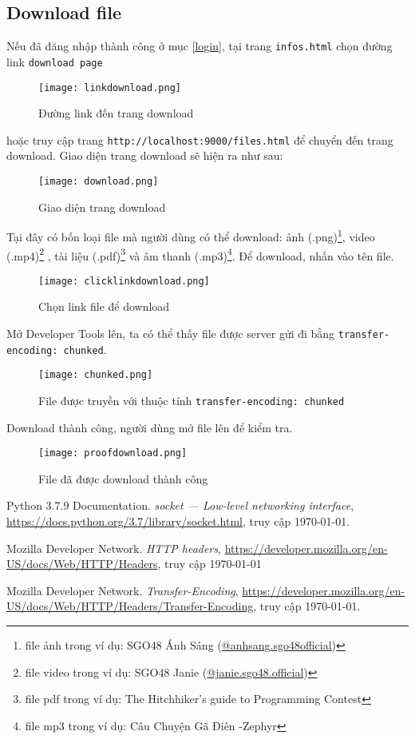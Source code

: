 \documentclass[]{article}
\begin{document}
\subsection{Download file}
Nếu đã đăng nhập thành công ở mục \ref{login}, tại trang \texttt{infos.html} chọn đường link \texttt{download page}
\begin{figure}[H]
\centering
\texttt{[image: linkdownload.png]}
\caption{Đường link đến trang download}
\end{figure}
hoặc truy cập trang \texttt{http://localhost:9000/files.html} để chuyển đến trang download. Giao diện trang download sẽ hiện ra như sau:
\begin{figure}[H]
\centering
\texttt{[image: download.png]}
\caption{Giao diện trang download}
\end{figure}
Tại đây có bốn loại file mà người dùng có thể download: ảnh (.png)\footnote{file ảnh trong ví dụ: SGO48 Ánh Sáng (\href{https://instagram.com/anhsang.sgo48official}{@anhsang.sgo48official})}, video (.mp4)\footnote{file video trong ví dụ: SGO48 Janie (\href{https://instagram.com/janie.sgo48.official}{@janie.sgo48.official})} , tài liệu (.pdf)\footnote{file pdf trong ví dụ: The Hitchhiker's guide to Programming Contest} và âm thanh (.mp3)\footnote{file mp3 trong ví dụ: Câu Chuyện Gã Điên -Zephyr}. Để download, nhấn vào tên file.
\begin{figure}[H]
\centering
\texttt{[image: clicklinkdownload.png]}
\caption{Chọn link file để download}
\end{figure}
Mở Developer Tools lên, ta có thể thấy file được server gửi đi bằng \texttt{transfer-encoding: chunked}.
\begin{figure}[H]
\centering
\texttt{[image: chunked.png]}
\caption{File được truyền với thuộc tính \texttt{transfer-encoding: chunked}}
\end{figure}
Download thành công, người dùng mở file lên để kiểm tra.
\begin{figure}[H]
\centering
\texttt{[image: proofdownload.png]}
\caption{File đã được download thành công}
\end{figure}

\begin{thebibliography}{10}
Python 3.7.9 Documentation.
\textit{socket — Low-level networking interface},
\url{https://docs.python.org/3.7/library/socket.html}, truy cập \today.

Mozilla Developer Network.
\textit{HTTP headers},
\url{https://developer.mozilla.org/en-US/docs/Web/HTTP/Headers}, truy cập \today

Mozilla Developer Network.
\textit{Transfer-Encoding},
\url{https://developer.mozilla.org/en-US/docs/Web/HTTP/Headers/Transfer-Encoding}, truy cập \today.
\end{thebibliography}
\end{document}
